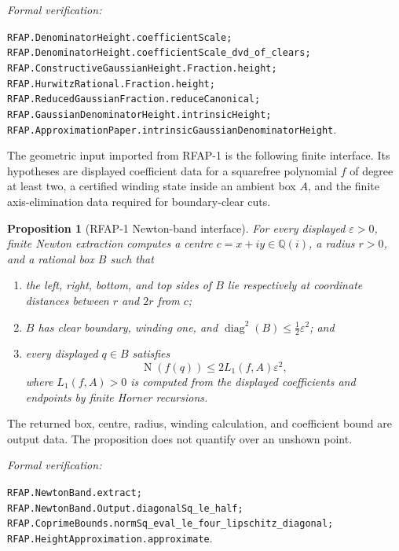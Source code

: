 \documentclass[11pt]{article}
\newtheorem{proposition}[proposition]{Proposition}
\newcommand{\Qi}{\mathbb{Q}(i)}
\newcommand{\Norm}[1]{\operatorname{N}\!\left(#1\right)}
\newcommand{\diamq}{\operatorname{diag}^{2}}
\newcommand{\eps}{\varepsilon}
\newcommand{\leanref}[1]{\par\smallskip\noindent
  \emph{Formal verification:}\par\nobreak
  {\raggedright\nolinkurl{#1}.\par}}
\begin{document}
\leanref{RFAP.DenominatorHeight.coefficientScale;
RFAP.DenominatorHeight.coefficientScale_dvd_of_clears;
RFAP.ConstructiveGaussianHeight.Fraction.height;
RFAP.HurwitzRational.Fraction.height;
RFAP.ReducedGaussianFraction.reduceCanonical;
RFAP.GaussianDenominatorHeight.intrinsicHeight;
RFAP.ApproximationPaper.intrinsicGaussianDenominatorHeight}

The geometric input imported from RFAP-1 is the following finite interface.
Its hypotheses are displayed coefficient data for a squarefree polynomial
$f$ of degree at least two, a certified winding state inside an ambient box
$A$, and the finite axis-elimination data required for boundary-clear cuts.

\begin{proposition}[RFAP-1 Newton-band interface]
\label{prop:rfap-input}
For every displayed $\eps>0$, finite Newton extraction computes a centre
$c=x+iy\in\Qi$, a radius $r>0$, and a rational box $B$ such that
\begin{enumerate}[label=(\roman*)]
\item the left, right, bottom, and top sides of $B$ lie respectively at
coordinate distances between $r$ and $2r$ from $c$;
\item $B$ has clear boundary, winding one, and
$\diamq(B)\le\tfrac12\eps^2$; and
\item every displayed $q\in B$ satisfies
\begin{equation}
\label{eq:box-residual}
                \Norm{f(q)}\le2L_1(f,A)\eps^2,
\end{equation}
where $L_1(f,A)>0$ is computed from the displayed coefficients and endpoints
by finite Horner recursions.
\end{enumerate}
\end{proposition}

The returned box, centre, radius, winding calculation, and coefficient bound
are output data.  The proposition does not quantify over an unshown point.

\leanref{RFAP.NewtonBand.extract;
RFAP.NewtonBand.Output.diagonalSq_le_half;
RFAP.CoprimeBounds.normSq_eval_le_four_lipschitz_diagonal;
RFAP.HeightApproximation.approximate}
\end{document}
